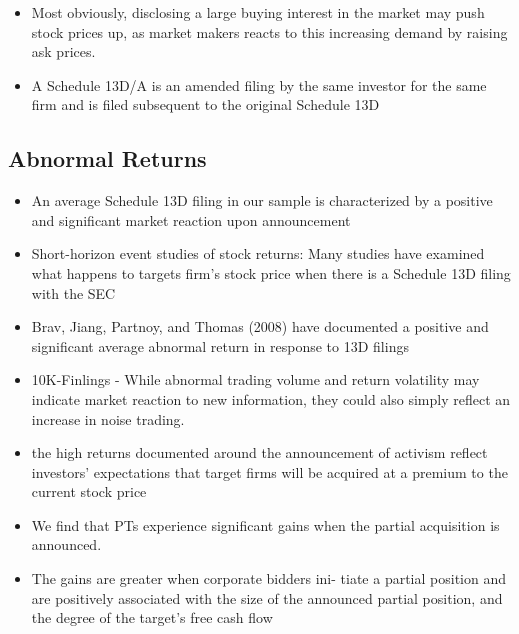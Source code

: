 \documentclass[12pt]{article}
\begin{document}
\begin{itemize}
        \item Most obviously, disclosing a large buying interest in the market may push stock prices up, as market makers reacts to this increasing demand by raising ask prices. \citep{Giglia2018}
        
        \item A Schedule 13D/A is an amended filing by the same investor for the same firm and is filed subsequent to the original Schedule 13D \citep{Klein2009}
    \end{itemize}

\subsection{Abnormal Returns}
    \begin{itemize}
        \item An average Schedule 13D filing in our sample is characterized by a positive and significant market reaction upon announcement \citep{Collin-Dufresne2015}

        \item Short-horizon event studies of stock returns: Many studies have examined what happens to targets firm’s stock price when there is a Schedule 13D filing with the SEC \citep{CoffeeJr.2014}

        \item Brav, Jiang, Partnoy, and Thomas (2008) have documented a positive and significant average abnormal return in response to 13D filings \citep{Brigida2012}

        \item 10K-Finlings - While abnormal trading volume and return volatility may indicate market reaction to new information, they could also simply reflect an increase in noise trading. \citep{You2009}

        \item the high returns documented around the announcement of activism reflect investors’ expectations that target firms will be acquired at a premium to the current stock price \citep{Greenwood2009}

        \item We find that PTs experience significant gains when the partial acquisition is announced. \citep{Akhigbe2007}
        
        \item The gains are greater when corporate bidders ini- tiate a partial position and are positively associated with the size of the announced partial position, and the degree of the target’s free cash flow \citep{Akhigbe2007}


    \end{itemize}
\end{document}
